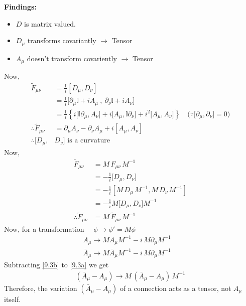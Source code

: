 \documentclass[14pt]{article} %
\begin{document}
\textbf{Findings:}
\begin{itemize}
\item $D$ is matrix valued.
\item $D_\mu$ transforms covariantly $\to$ Tensor
\item $A_\mu$ doesn't transform covariently $\to$ Tensor
\end{itemize}
Now,
\begin{align*}
\tilde{F}_{\mu \nu} &= \frac{1}{i} [D_\mu, D_\nu] \\
&= \frac{1}{i}\big[\partial_\mu \mathbb{I}+ i A_\mu ~,~ \partial_\nu \mathbb{I}+ i A_\nu  \big] \\
&= \frac{1}{i}\left\{ i \big[ \mathbb{I} \partial_\mu , A_\nu \big] + i\big[ A_{\mu}, \mathbb{I} \partial_\nu\big]+i^2 \big[A_\mu , A_\nu \big] \right\} \quad \big( \because \big[ \partial_\mu , \partial_\nu \big] =0 \big)  \\
\therefore\tilde{F}_{\mu\nu} &= \partial_\mu A_\nu - \partial_\nu A_\mu + i[A_\mu, A_\nu] \\
\therefore [D_\mu, &D_\nu] \text{ is a curvature}
\end{align*}
Now,
\begin{align*}
\tilde{F}_{\mu \nu} &= M \,F_{\mu \nu} \, M^{-1} \\
&= -\frac{1}{i} \big[D_\mu, D_\nu \big] \\
&= -\frac{1}{i} \left[ M \,D_\mu \,M^{-1}, M \, D_\nu \, M^{-1} \right] \\
&= -\frac{1}{i} M \big[D_\mu, D_\nu \big] M^{-1} \\
\therefore \tilde{F}_{\mu \nu}&= M \,\tilde{F}_{\mu \nu}\, M^{-1}
\end{align*}
Now, for a transformation $\quad \phi \to \phi' = M \phi$
\begin{align*}
A_\mu \to M A_\mu M^{-1} - i \,M \partial_\mu M^{-1} \quad \tag{9.3a} \label{9.3a} \\
\bar{A}_\mu \to M \bar{A}_\mu M^{-1} - i\,M \partial_\mu M^{-1} \quad \tag{9.3b} \label{9.3b}
\end{align*}
Subtracting \eqref{9.3b} to \eqref{9.3a} we get
\begin{align*}
(\bar{A}_\mu - A_\mu) \to M\,(\bar{A}_\mu - A_\mu) \, M^{-1}
\end{align*}
Therefore, the variation $(\bar{A}_\mu - A_\mu)$ of a connection acts as a tensor, not $A_\mu$ itself.
\end{document}
